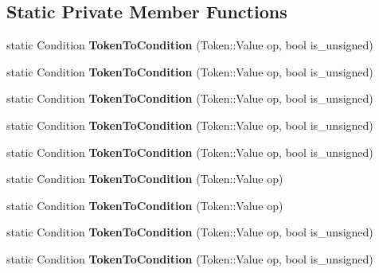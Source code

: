 \subsection*{Static Private Member Functions}
\begin{DoxyCompactItemize}
\item 
static Condition {\bfseries Token\+To\+Condition} (Token\+::\+Value op, bool is\+\_\+unsigned)\hypertarget{classv8_1_1internal_1_1_l_code_gen_a327934eebc13dbc2d30974006dd85be6}{}\label{classv8_1_1internal_1_1_l_code_gen_a327934eebc13dbc2d30974006dd85be6}

\item 
static Condition {\bfseries Token\+To\+Condition} (Token\+::\+Value op, bool is\+\_\+unsigned)\hypertarget{classv8_1_1internal_1_1_l_code_gen_aace196ba7419e6296b77dd523719cddf}{}\label{classv8_1_1internal_1_1_l_code_gen_aace196ba7419e6296b77dd523719cddf}

\item 
static Condition {\bfseries Token\+To\+Condition} (Token\+::\+Value op, bool is\+\_\+unsigned)\hypertarget{classv8_1_1internal_1_1_l_code_gen_aace196ba7419e6296b77dd523719cddf}{}\label{classv8_1_1internal_1_1_l_code_gen_aace196ba7419e6296b77dd523719cddf}

\item 
static Condition {\bfseries Token\+To\+Condition} (Token\+::\+Value op, bool is\+\_\+unsigned)\hypertarget{classv8_1_1internal_1_1_l_code_gen_aace196ba7419e6296b77dd523719cddf}{}\label{classv8_1_1internal_1_1_l_code_gen_aace196ba7419e6296b77dd523719cddf}

\item 
static Condition {\bfseries Token\+To\+Condition} (Token\+::\+Value op, bool is\+\_\+unsigned)\hypertarget{classv8_1_1internal_1_1_l_code_gen_aace196ba7419e6296b77dd523719cddf}{}\label{classv8_1_1internal_1_1_l_code_gen_aace196ba7419e6296b77dd523719cddf}

\item 
static Condition {\bfseries Token\+To\+Condition} (Token\+::\+Value op)\hypertarget{classv8_1_1internal_1_1_l_code_gen_a5b0470bc663cd29e8d0f5a927a41a21f}{}\label{classv8_1_1internal_1_1_l_code_gen_a5b0470bc663cd29e8d0f5a927a41a21f}

\item 
static Condition {\bfseries Token\+To\+Condition} (Token\+::\+Value op)\hypertarget{classv8_1_1internal_1_1_l_code_gen_a5ff9bc8b99996588626e27521509f3cc}{}\label{classv8_1_1internal_1_1_l_code_gen_a5ff9bc8b99996588626e27521509f3cc}

\item 
static Condition {\bfseries Token\+To\+Condition} (Token\+::\+Value op, bool is\+\_\+unsigned)\hypertarget{classv8_1_1internal_1_1_l_code_gen_aace196ba7419e6296b77dd523719cddf}{}\label{classv8_1_1internal_1_1_l_code_gen_aace196ba7419e6296b77dd523719cddf}

\item 
static Condition {\bfseries Token\+To\+Condition} (Token\+::\+Value op, bool is\+\_\+unsigned)\hypertarget{classv8_1_1internal_1_1_l_code_gen_aace196ba7419e6296b77dd523719cddf}{}\label{classv8_1_1internal_1_1_l_code_gen_aace196ba7419e6296b77dd523719cddf}

\end{DoxyCompactItemize}
